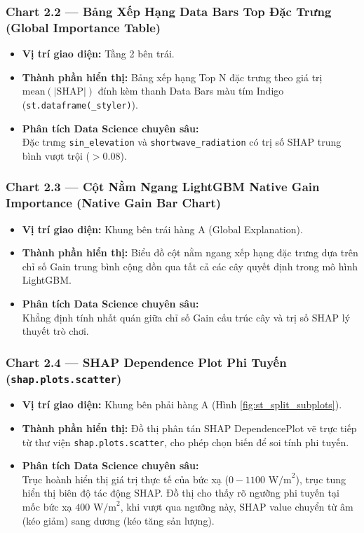 \documentclass[12pt,a4paper]{article}
\begin{document}
\subsubsection{Chart 2.2 — Bảng Xếp Hạng Data Bars Top Đặc Trưng (Global Importance Table)}
\begin{itemize}
    \item \textbf{Vị trí giao diện:} Tầng 2 bên trái.
    \item \textbf{Thành phần hiển thị:} Bảng xếp hạng Top N đặc trưng theo giá trị $\text{mean}(|\text{SHAP}|)$ đính kèm thanh Data Bars màu tím Indigo\\(\texttt{st.dataframe(\_styler)}).
    \item \textbf{Phân tích Data Science chuyên sâu:}\\ 
    Đặc trưng \texttt{sin\_elevation} và \texttt{shortwave\_radiation} có trị số SHAP trung bình vượt trội ($> 0.08$).
\end{itemize}

\subsubsection{Chart 2.3 — Cột Nằm Ngang LightGBM Native Gain Importance (Native Gain Bar Chart)}
\begin{itemize}
    \item \textbf{Vị trí giao diện:} Khung bên trái hàng A (Global Explanation).
    \item \textbf{Thành phần hiển thị:} Biểu đồ cột nằm ngang xếp hạng đặc trưng dựa trên chỉ số Gain trung bình cộng dồn qua tất cả các cây quyết định trong mô hình LightGBM.
    \item \textbf{Phân tích Data Science chuyên sâu:}\\ 
    Khẳng định tính nhất quán giữa chỉ số Gain cấu trúc cây và trị số SHAP lý thuyết trò chơi.
\end{itemize}

\subsubsection[Chart 2.4 — SHAP Dependence Plot]{Chart 2.4 — SHAP Dependence Plot Phi Tuyến\\(\texttt{shap.plots.scatter})}
\begin{itemize}
    \item \textbf{Vị trí giao diện:} Khung bên phải hàng A (Hình \ref{fig:st_split_subplots}).
    \item \textbf{Thành phần hiển thị:} Đồ thị phân tán SHAP DependencePlot vẽ trực tiếp từ thư viện \texttt{shap.plots.scatter}, cho phép chọn biến để soi tính phi tuyến.
    \item \textbf{Phân tích Data Science chuyên sâu:}\\ 
    Trục hoành hiển thị giá trị thực tế của bức xạ ($0 - 1100\text{ W/m}^2$), trục tung hiển thị biên độ tác động SHAP. Đồ thị cho thấy rõ ngưỡng phi tuyến tại mốc bức xạ $400\text{ W/m}^2$, khi vượt qua ngưỡng này, SHAP value chuyển từ âm (kéo giảm) sang dương (kéo tăng sản lượng).
\end{itemize}
\end{document}
